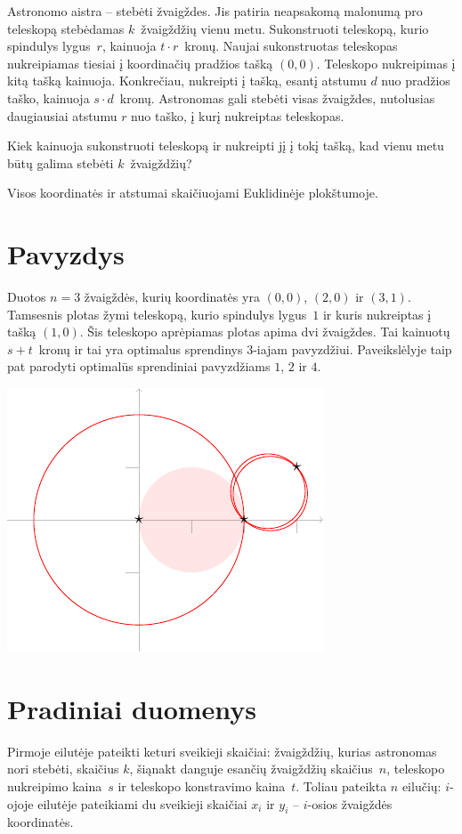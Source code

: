 
\noindent
Astronomo aistra -- stebėti žvaigždes.
Jis patiria neapsakomą malonumą pro teleskopą stebėdamas $k$~žvaigždžių vienu metu.
Sukonstruoti teleskopą, kurio spindulys lygus~$r$, kainuoja $t\cdot r$~kronų.
Naujai sukonstruotas teleskopas nukreipiamas tiesiai į koordinačių pradžios tašką $(0,0)$. 
Teleskopo nukreipimas į kitą tašką kainuoja. Konkrečiau,  nukreipti į tašką, esantį atstumu $d$ nuo pradžios taško, kainuoja $s\cdot d$~kronų.
Astronomas gali stebėti visas žvaigždes, nutolusias daugiausiai atstumu $r$ nuo taško, 
į kurį nukreiptas teleskopas.

Kiek kainuoja sukonstruoti teleskopą ir nukreipti jį į tokį tašką, kad vienu metu būtų galima stebėti $k$~žvaigždžių?

\medskip

Visos koordinatės ir atstumai skaičiuojami Euklidinėje plokštumoje.


\section*{Pavyzdys}

Duotos $n=3$ žvaigždės, kurių koordinatės yra $(0,0)$, $(2,0)$ ir $(3,1)$.
Tamsesnis plotas žymi teleskopą, kurio spindulys lygus~$1$ ir kuris nukreiptas į tašką $(1,0)$. Šis teleskopo aprėpiamas plotas apima dvi žvaigždes. Tai kainuotų $s + t$~kronų ir tai yra optimalus sprendinys $3$-iajam pavyzdžiui.
Paveikslėlyje taip pat parodyti optimalūs sprendiniai pavyzdžiams  $1$, $2$ ir $4$.

\medskip
\noindent
\includegraphics[width=.3\textwidth]{img/samples.pdf}


\section*{Pradiniai duomenys}

Pirmoje eilutėje pateikti keturi sveikieji skaičiai:
žvaigždžių, kurias astronomas nori stebėti, skaičius $k$,
šiąnakt danguje esančių žvaigždžių skaičius~$n$, 
teleskopo nukreipimo kaina~$s$ ir
teleskopo konstravimo kaina~$t$.
Toliau pateikta $n$ eilučių: $i$-ojoje eilutėje pateikiami du sveikieji skaičiai $x_i$ ir $y_i$ -- 
$i$-osios žvaigždės koordinatės.

